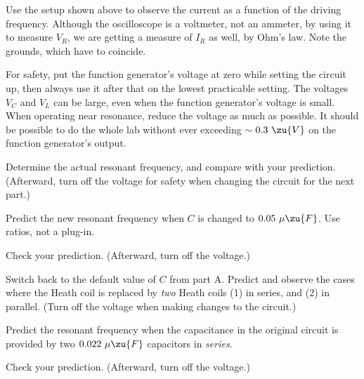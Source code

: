 
\pagebreak

\obs Use the setup shown above to observe the current as a function of the driving frequency. Although the
oscilloscope is a voltmeter, not an ammeter, by using it to measure $V_R$, we are getting a measure of $I_R$
as well, by Ohm's law. Note the grounds, which have to coincide.

For safety, put the function generator's voltage at zero while setting the circuit up, then always use it
after that on the lowest practicable setting. The voltages $V_C$ and $V_L$ can be large, even when the function
generator's voltage is small. When operating near resonance, reduce the voltage as much as possible. It should be
possible to do the whole lab without ever exceeding $\sim 0.3\ \zu{V}$ on the function generator's output.

Determine the actual resonant frequency, and compare with your prediction. (Afterward, turn off the voltage
for safety when changing the circuit for the next part.)



\predict
Predict the new resonant frequency when $C$ is changed to $0.05\ \mu\zu{F}$. Use ratios, not a plug-in.

\obs
Check your prediction. (Afterward, turn off the voltage.)



Switch back to the default value of $C$ from part A.
Predict and observe the cases where the Heath coil is replaced by \emph{two} Heath coils (1) in series,
and (2) in parallel.
(Turn off the voltage when making changes to the circuit.)


\pagebreak


\predict
Predict the resonant frequency when the capacitance in the original circuit is provided by two $0.022\ \mu\zu{F}$
capacitors in \emph{series}.

\obs
Check your prediction. (Afterward, turn off the voltage.)


